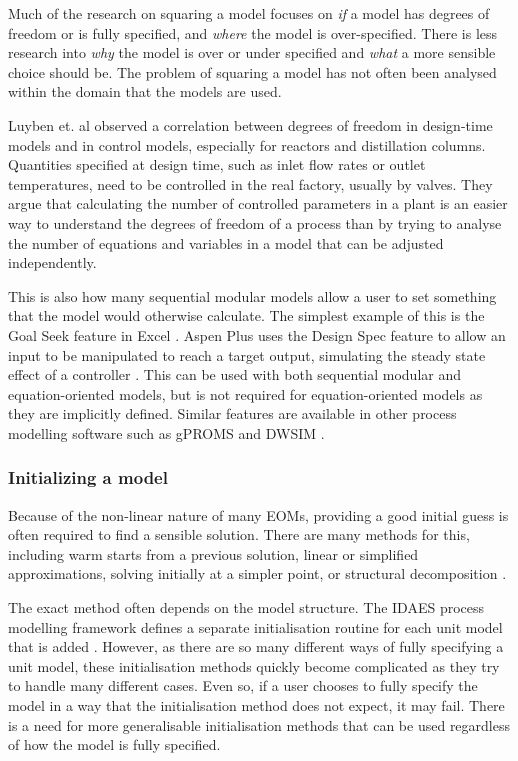 Much of the research on squaring a model focuses on \emph{if} a model
has degrees of freedom or is fully specified, and \emph{where} the model
is over-specified. There is less research into \emph{why} the model is
over or under specified and \emph{what} a more sensible choice should
be. The problem of squaring a model has not often been analysed within
the domain that the models are used.

Luyben et. al \citep{luyben1996design} observed a correlation between
degrees of freedom in design-time models and in control models,
especially for reactors and distillation columns. Quantities specified
at design time, such as inlet flow rates or outlet
temperatures, need to be controlled in the real factory, usually by
valves. They argue that calculating the number of controlled parameters
in a plant is an easier way to understand the degrees of freedom of a
process than by trying to analyse the number of equations and variables
in a model that can be adjusted independently.

This is also how many sequential modular models allow a user to set something
that the model would otherwise calculate. The simplest example of this is the 
Goal Seek feature in Excel \citep{microsoft_goalseek_support}.
Aspen Plus uses the Design Spec feature to allow an input to be manipulated to
reach a target output, simulating the steady state effect of a controller \citep{aspenplus111_userguide}.
This can be used with both sequential modular and equation-oriented models, 
but is not required for equation-oriented models as they are implicitly defined. 
Similar features are available in other process modelling software such as gPROMS and DWSIM
\citep{amador2019introduction} \citep{tangsriwong2020modeling}.

\hypertarget{initialising-a-model}{%
\subsubsection{Initializing a model}\label{initializing-a-model}}

Because of the non-linear nature of many EOMs, providing a good initial guess
is often required to find a sensible solution. There are many methods for this,
including warm starts from a previous solution, linear or simplified approximations,
solving initially at a simpler point, or structural decomposition \citep{SAFDARNEJAD201539}.

The exact method often depends on the model structure. The IDAES process modelling framework
defines a separate initialisation routine for each unit model that is added \citep{lee2021idaes}. However, as there
are so many different ways of fully specifying a unit model, these initialisation methods quickly become complicated
as they try to handle many different cases. Even so, if a user chooses to fully specify 
the model in a way that the initialisation method does not expect, it may fail. 
There is a need for more generalisable initialisation methods that can be used regardless of how the model is fully specified.

